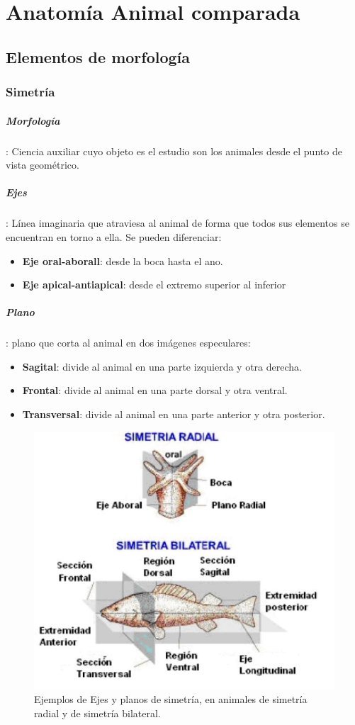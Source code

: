 \chapter{Anatomía Animal comparada}
\section{Elementos de morfología}
\subsection{Simetría}
\paragraph{Morfología}: Ciencia auxiliar cuyo objeto es el estudio son los animales desde el punto de vista geométrico.
\paragraph{Ejes}: Línea imaginaria que atraviesa al animal de forma que todos sus elementos se encuentran en torno a ella. Se pueden diferenciar:
\begin{itemize}[itemsep=0pt,parsep=0pt,topsep=0pt,partopsep=0pt]
    \item \textbf{Eje oral-aborall}: desde la boca hasta el ano.
    \item\textbf{Eje apical-antiapical}: desde el extremo superior al inferior
\end{itemize}
\paragraph{Plano}: plano que corta al animal en dos imágenes especulares:
\begin{itemize}[itemsep=0pt,parsep=0pt,topsep=0pt,partopsep=0pt]
    \item \textbf{Sagital}: divide al animal en una parte izquierda y otra derecha.
    \item\textbf{Frontal}: divide al animal en una parte dorsal y otra ventral.
    \item\textbf{Transversal}: divide al animal en una parte anterior y otra posterior.
\end{itemize}
\begin{figure}[H]
    \centering
    \includegraphics[width=0.65\columnwidth]{A.imagenes/ACV-ANATANIM-EjesPlanos}
    \caption[Ejemplos de Ejes y planos de simetría]{Ejemplos de Ejes y planos de simetría, en animales de simetría radial y de simetría bilateral.}
\end{figure}
